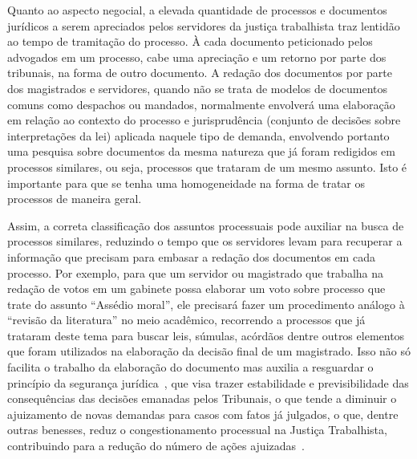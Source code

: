 Quanto ao aspecto negocial, a elevada quantidade de processos e documentos jurídicos a serem apreciados pelos servidores da justiça trabalhista traz lentidão ao tempo de tramitação do processo.  À cada documento peticionado pelos advogados em um processo, cabe uma apreciação e um retorno por parte dos tribunais, na forma de outro documento. A redação dos documentos por parte dos magistrados e servidores, quando não se trata de modelos de documentos comuns como despachos ou mandados, normalmente envolverá uma elaboração em relação ao contexto do processo e jurisprudência (conjunto de decisões sobre interpretações da lei) aplicada naquele tipo de demanda, envolvendo portanto uma pesquisa sobre documentos da mesma natureza que já foram redigidos em processos similares, ou seja, processos que trataram de um mesmo assunto. Isto é importante para que se tenha uma homogeneidade na forma de tratar os processos de maneira geral. 

Assim, a correta classificação dos assuntos processuais pode auxiliar na busca de processos similares, reduzindo o tempo que os servidores levam para recuperar a informação que precisam para embasar a redação dos documentos em cada processo. Por exemplo, para que um servidor ou magistrado que trabalha na redação de votos em um gabinete possa elaborar um voto sobre processo que trate do assunto “Assédio moral”, ele precisará fazer um procedimento análogo à “revisão da literatura” no meio acadêmico, recorrendo a processos que já trataram deste tema para buscar leis, súmulas, acórdãos dentre outros elementos que foram utilizados na elaboração da decisão final de um magistrado. Isso não só facilita o trabalho da elaboração do documento mas auxilia a resguardar o princípio da segurança jurídica~\cite{segurancajuridica}, que visa trazer estabilidade e previsibilidade das consequências das decisões emanadas pelos Tribunais, o que tende a diminuir o ajuizamento de novas demandas para casos com fatos já julgados, o que, dentre outras benesses, reduz o congestionamento processual na Justiça Trabalhista, contribuindo para a redução do número de ações ajuizadas~\cite{carvalho_o_2017}.

